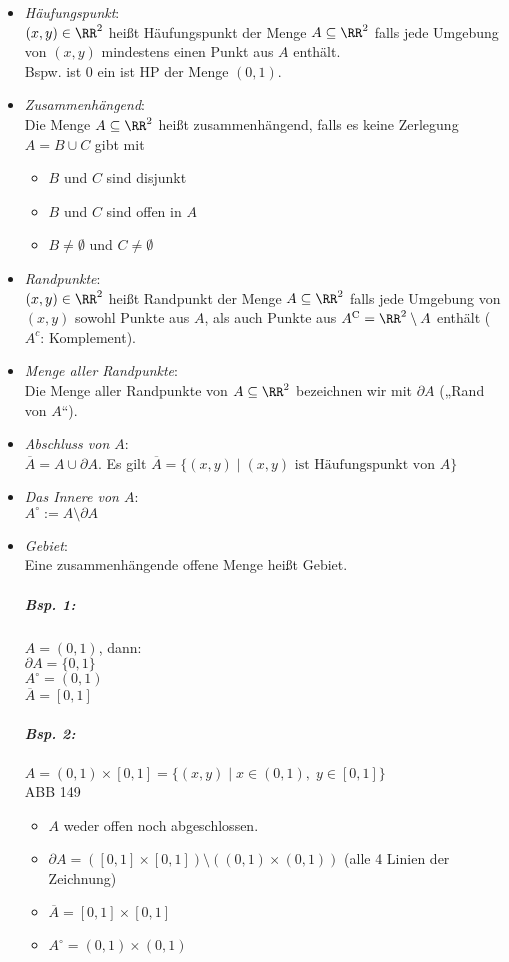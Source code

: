 \begin{itemize}
\begin{enumerate}
\end{enumerate}
\item \emph{Häufungspunkt}:\\
$(x,y) \in \RR^2$ heißt Häufungspunkt der Menge $A\subseteq \RR^2$ falls jede Umgebung von $(x,y)$ mindestens einen Punkt aus $A$ enthält.\\
Bspw. ist $0$ ein ist HP der Menge $(0,1)$.
\item \emph{Zusammenhängend}:\\
Die Menge $A\subseteq \RR^2$ heißt zusammenhängend, falls es keine Zerlegung $A=B\cup C$ gibt mit 
\begin{itemize}
\item $B$ und $C$ sind disjunkt
\item $B$ und $C$ sind offen in $A$
\item $B \not = \emptyset$ und $C\not = \emptyset$
\end{itemize} 
\item \emph{Randpunkte}:\\
$(x,y) \in \RR^2$ heißt Randpunkt der Menge $A \subseteq \RR^2$ falls jede Umgebung von $(x,y)$ sowohl Punkte aus $A$, als auch Punkte aus $A^{\mathrm{C}}=\RR^2 \setminus A$ enthält ($A^c$: Komplement).
\item \emph{Menge aller Randpunkte}:\\
Die Menge aller Randpunkte von $A\subseteq \RR^2$ bezeichnen wir mit $\partial A$ („Rand von $A$“). 
\item \emph{Abschluss von $A$}:\\
$\overline{A}=A \cup \partial A$. Es gilt $\overline{A}=\{ (x,y) \;|\; (x,y) \text{ ist Häufungspunkt von }A\}$
\item \emph{Das Innere von $A$}: \\
$A^\circ:= A \setminus \partial A$
\item \emph{Gebiet}:\\
Eine zusammenhängende offene Menge heißt Gebiet.
\subparagraph{Bsp. 1:} $A=(0,1)$, dann:\\
$\partial A = \{ 0,1\}$\\
$A^\circ = (0,1)$\\
$\overline{A}=[0,1]$
\subparagraph{Bsp. 2:} $A=(0,1) \times [0,1] = \{ (x,y) \mid x\in (0,1), \; y\in [0,1]\}$\\
ABB 149
\begin{itemize}
\item $A$ weder offen noch abgeschlossen.
\item $\partial A=([0,1]\times [0,1])\setminus ((0,1) \times (0,1) )$ (alle 4 Linien der Zeichnung)
\item $\overline{A}=[0,1]\times [0,1]$
\item $A^\circ = (0,1) \times (0,1)$
\end{itemize}
\end{itemize}
